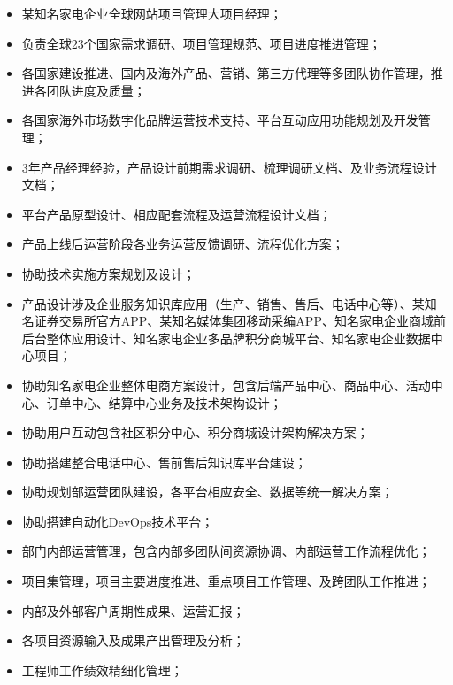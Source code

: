 \documentclass{resume}
\begin{document}
\begin{itemize}
    \item 某知名家电企业全球网站项目管理大项目经理；
    \item 负责全球23个国家需求调研、项目管理规范、项目进度推进管理；
    \item 各国家建设推进、国内及海外产品、营销、第三方代理等多团队协作管理，推进各团队进度及质量；
    \item 各国家海外市场数字化品牌运营技术支持、平台互动应用功能规划及开发管理；
\end{itemize}

\begin{itemize}
    \item 3年产品经理经验，产品设计前期需求调研、梳理调研文档、及业务流程设计文档；
    \item 平台产品原型设计、相应配套流程及运营流程设计文档；
    \item 产品上线后运营阶段各业务运营反馈调研、流程优化方案；
    \item 协助技术实施方案规划及设计；
    \item 产品设计涉及企业服务知识库应用（生产、销售、售后、电话中心等）、某知名证券交易所官方APP、某知名媒体集团移动采编APP、知名家电企业商城前后台整体应用设计、知名家电企业多品牌积分商城平台、知名家电企业数据中心项目；
\end{itemize}

\begin{itemize}
    \item 协助知名家电企业整体电商方案设计，包含后端产品中心、商品中心、活动中心、订单中心、结算中心业务及技术架构设计；
    \item 协助用户互动包含社区积分中心、积分商城设计架构解决方案；
    \item 协助搭建整合电话中心、售前售后知识库平台建设；
    \item 协助规划部运营团队建设，各平台相应安全、数据等统一解决方案；
    \item 协助搭建自动化DevOps技术平台；
\end{itemize}

\begin{itemize}
    \item 部门内部运营管理，包含内部多团队间资源协调、内部运营工作流程优化；
    \item 项目集管理，项目主要进度推进、重点项目工作管理、及跨团队工作推进；
    \item 内部及外部客户周期性成果、运营汇报；
    \item 各项目资源输入及成果产出管理及分析；
    \item 工程师工作绩效精细化管理；
\end{itemize}
\end{document}
